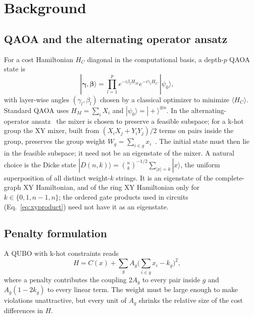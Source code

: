 \documentclass{article}
\begin{document}
\section{Background}
\label{sec:background}

\subsection{QAOA and the alternating operator ansatz}
For a cost Hamiltonian $H_C$ diagonal in the computational basis, a depth-$p$ QAOA state is
\begin{equation}
|\boldsymbol\gamma,\boldsymbol\beta\rangle=\prod_{l=1}^{p} e^{-i\beta_l H_M}e^{-i\gamma_l H_C}\,|\psi_0\rangle ,
\end{equation}
with layer-wise angles $(\gamma_l,\beta_l)$ chosen by a classical optimizer to minimize $\langle H_C\rangle$.
Standard QAOA uses $H_M=\sum_iX_i$ and $|\psi_0\rangle=|+\rangle^{\otimes n}$.
In the alternating-operator ansatz~\cite{Hadfield_2019} the mixer is chosen to preserve a feasible subspace; for a k-hot group the XY mixer, built from $(X_iX_j+Y_iY_j)/2$ terms on pairs inside the group, preserves the group weight $W_g=\sum_{i\in g}x_i$~\cite{wang2020xy}.
The initial state must then lie in the feasible subspace; it need not be an eigenstate of the mixer.
A natural choice is the Dicke state $|D(n,k)\rangle=\binom{n}{k}^{-1/2}\sum_{|x|=k}|x\rangle$, the uniform superposition of all distinct weight-$k$ strings.
It is an eigenstate of the complete-graph XY Hamiltonian, and of the ring XY Hamiltonian only for $k\in\{0,1,n-1,n\}$; the ordered gate products used in circuits (Eq.~\eqref{eq:xyproduct}) need not have it as an eigenstate.

\subsection{Penalty formulation}
A QUBO with k-hot constraints reads
\begin{equation}
H=C(x)+\sum_{g}A_g\Big(\sum_{i\in g}x_i-k_g\Big)^2 ,
\end{equation}
where a penalty contributes the coupling $2A_g$ to every pair inside $g$ and $A_g(1-2k_g)$ to every linear term.
The weight must be large enough to make violations unattractive, but every unit of $A_g$ shrinks the relative size of the cost differences in $H$.
\end{document}

